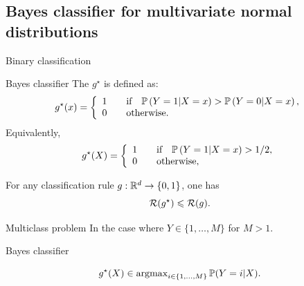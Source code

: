 \documentclass[xcolor={usenames,dvipsnames},handout]{beamer}
\begin{document}
\subsection{Bayes classifier for multivariate normal distributions}

\begin{frame}{Binary classification}

\begin{block}{Bayes classifier} 
The  $g^\star$ is defined as:
$$
g^{\star}(x) =
\left\{
	\begin{array}{cc}
		1 &\quad \text{if} \quad \P \left( Y=1 | X=x \right) > \P \left( Y=0 | X=x \right), \\
		0 &\quad \text{otherwise}. \hfill
	\end{array}
\right.
$$
Equivalently,
$$
g^{\star}(X) =
\left\{
	\begin{array}{cc}
		1 &\quad \text{if} \quad \P \left( Y=1 | X=x \right)> 1/2, \\
		0 &\quad \text{otherwise}, \hfill
	\end{array}
\right.
$$
\end{block}
\begin{lemma}
For any classification rule $g :  \mathbb{R}^d \to \{0,1\}$, one has
$$
{\mathcal{R}}(g^\star) \leqslant {\mathcal{R}}(g).
$$
\end{lemma}
\end{frame}

\begin{frame}{Multiclass problem}
In the case where \alert{$Y\in \{1,\ldots,M\}$ for $M>1$}.

\vspace{.5cm}

\begin{exampleblock}{Bayes classifier}

	$$
		g^\star(X) \in \operatorname{argmax}_{i \in \{1,\ldots,M\}}\mathbb{P} (Y=i | X).
	$$
\end{exampleblock}
\end{frame}
	
\end{document}
